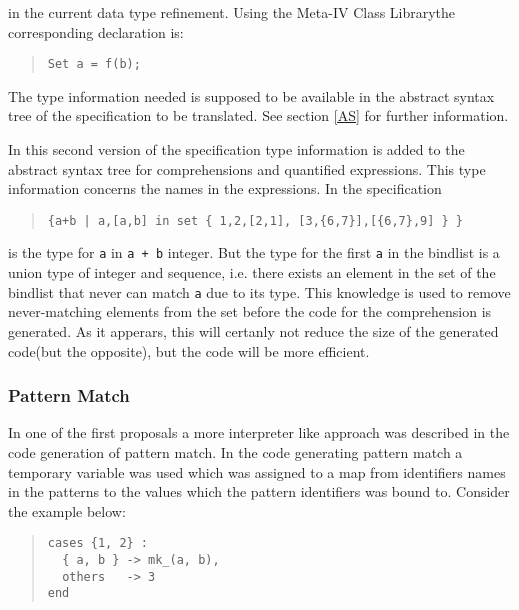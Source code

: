 \documentclass[a4paper,dvips]{article}
\newcommand{\MCL}{Meta-IV Class Library}
\begin{document}
in the current data type refinement. Using the \MCL the corresponding
declaration is:

\begin{quote}
\begin{verbatim}
Set a = f(b);
\end{verbatim}
\end{quote}

The type information needed is supposed to be available in the
abstract syntax tree of the specification to be translated. See
section \ref{AS} for further information.

In this second version of the specification type information is added
to the abstract syntax tree for comprehensions and quantified
expressions.  This type information concerns the names in the
expressions. In the specification 

\begin{quote}
\begin{verbatim}
{a+b | a,[a,b] in set { 1,2,[2,1], [3,{6,7}],[{6,7},9] } } 
\end{verbatim}
\end{quote}

is the type for {\tt a} in {\tt a + b} integer. But the type for the
first {\tt a} in the bindlist is a union type of integer and sequence,
i.e. there exists an element in the set of the bindlist that never can
match {\tt a} due to its type. This knowledge is used to remove
never-matching elements from the set before the code for
the comprehension is generated. As it apperars, this will certanly not
reduce the size of the generated code(but the opposite), but the code
will be more efficient.  

\subsubsection{Pattern Match}

In one of the first proposals a more interpreter like approach was
described in the code generation of pattern match. In the code generating
pattern match a temporary variable was used which was assigned to a
map from identifiers names in the patterns to the values which the
pattern identifiers was bound to. Consider the example below:

\begin{quote}
\begin{verbatim}
cases {1, 2} :
  { a, b } -> mk_(a, b),
  others   -> 3
end
\end{verbatim}
\end{quote}
\end{document}
